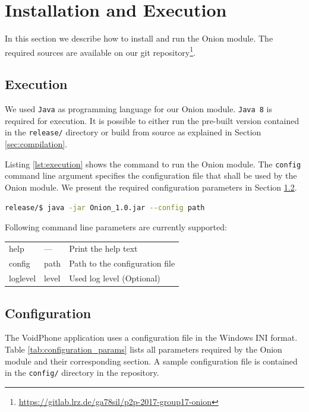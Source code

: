 \documentclass[paper=letter, fontsize=12pt]{article}
\begin{document}
\section{Installation and Execution}
In this section we describe how to install and run the Onion module.
The required sources are available on our git repository\footnote{\url{https://gitlab.lrz.de/ga78sil/p2p-2017-group17-onion}}.

\subsection{Execution}
We used \texttt{Java} as programming language for our Onion module.
\texttt{Java 8} is required for execution.
It is possible to either run the pre-built version contained in the \texttt{release/} directory or build from source as explained in Section \ref{sec:compilation}.


Listing \ref{lst:execution} shows the command to run the Onion module.
The \texttt{config} command line argument specifies the configuration file that shall be used by the Onion module.
We present the required configuration parameters in Section \ref{sec:configuration}.

\begin{lstlisting}[language=bash, caption=Command to execute the Onion module, label=lst:execution]
release/$ java -jar Onion_1.0.jar --config path
\end{lstlisting}

\noindent
Following command line parameters are currently supported:

\begin{table}[H]
    \centering
    \begin{tabular}{l l p{5cm}}
        help        & ---   & Print the help text \\
        config      & path  & Path to the configuration file \\
        loglevel    & level & Used log level (Optional) \\
    \end{tabular}
\end{table}

\subsection{Configuration} \label{sec:configuration}
The VoidPhone application uses a configuration file in the Windows INI format.
Table \ref{tab:configuration_params} lists all parameters required by the Onion module and their corresponding section.
A sample configuration file is contained in the \texttt{config/} directory in the repository.
\end{document}
